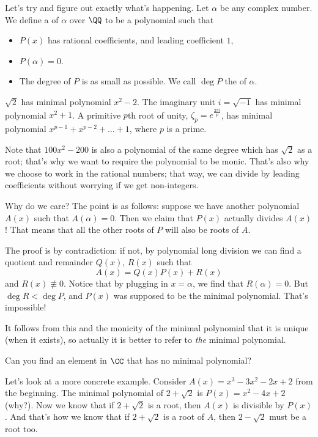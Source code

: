 Let's try and figure out exactly what's happening.
Let $\alpha$ be any complex number.
We define a  of $\alpha$ over $\QQ$ to be a polynomial such that
\begin{itemize}
	\item $P(x)$ has rational coefficients, and leading coefficient $1$,
	\item $P(\alpha) = 0$.
	\item The degree of $P$ is as small as possible.
		We call $\deg P$ the  of $\alpha$.
\end{itemize}
\begin{example}
	\listhack
	\begin{enumerate}[(a)]
	\ii $\sqrt 2$ has minimal polynomial $x^2-2$.
	\ii The imaginary unit $i = \sqrt{-1}$ has minimal polynomial $x^2+1$.
	\ii A primitive $p$th root of unity, $\zeta_p = e^{\frac{2\pi i}{p}}$, has minimal polynomial $x^{p-1} + x^{p-2} + \dots + 1$, where $p$ is a prime.
	\end{enumerate}
\end{example}
Note that $100x^2 - 200$ is also a polynomial of the same degree which has $\sqrt 2$ as a root; that's why we want to require the polynomial to be monic. That's also why we choose to work in the rational numbers; that way, we can divide by leading coefficients without worrying if we get non-integers.

Why do we care? The point is as follows: suppose we have another polynomial $A(x)$ such that $A(\alpha) = 0$.
Then we claim that $P(x)$ actually divides $A(x)$!
That means that all the other roots of $P$ will also be roots of $A$.

The proof is by contradiction: if not, by polynomial long division we can find a quotient and remainder $Q(x)$, $R(x)$ such that
\[ A(x) = Q(x) P(x) + R(x) \]
and $R(x) \not\equiv 0$.
Notice that by plugging in $x = \alpha$, we find that $R(\alpha) = 0$.
But $\deg R < \deg P$, and $P(x)$ was supposed to be the minimal polynomial.
That's impossible!

It follows from this and the monicity of the minimal polynomial
that it is unique (when it exists), so actually it is better to refer to
\emph{the} minimal polynomial.
\begin{exercise}
	Can you find an element in $\CC$
	that has no minimal polynomial?
\end{exercise}

Let's look at a more concrete example.
Consider $A(x) = x^3-3x^2-2x+2$ from the beginning.
The minimal polynomial of $2 + \sqrt 2$ is $P(x) = x^2 - 4x + 2$ (why?).
Now we know that if $2 + \sqrt 2$ is a root, then $A(x)$ is divisible by $P(x)$.
And that's how we know that if $2 + \sqrt 2$ is a root of $A$, then $2 - \sqrt 2$ must be a root too.

